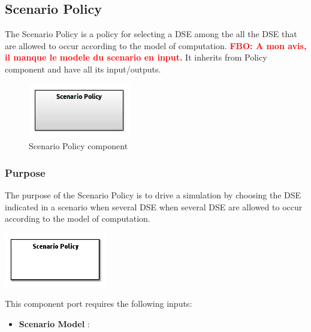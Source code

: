 \documentclass{gemoc} %
\begin{document}
\subsection{Scenario Policy}
The Scenario Policy is a policy for selecting a DSE among the all the DSE that are allowed to occur according to the model of computation.
\textcolor{red}{\textbf{FBO: A mon avis, il manque le modele du scenario en input.}}
It inherits from Policy component and have all its input/outputs.
\begin{figure}[htp]
	\begin{center}
	\includegraphics*[trim=0.0cm 0.0cm 0cm 0.0cm, clip=true, scale=1.0]{../images/generated/Generated_Scenario Policy.jpg}
	\caption{Scenario Policy component}
	\end{center}
\end{figure}

\subsubsection{Purpose}
The purpose of the Scenario Policy is to drive a simulation by choosing the DSE indicated in a scenario when several DSE when several DSE are allowed to occur according to the model of computation.
\begin{center}
\includegraphics*[trim=0.0cm 0.0cm 0cm 0.0cm, clip=true]{../images/generated/Generated_Scenario_Policy.png}
\end{center}

This component port requires the following inputs:
\begin{itemize}
  \item \textbf{Scenario Model} :
\end{itemize}
\end{document}
